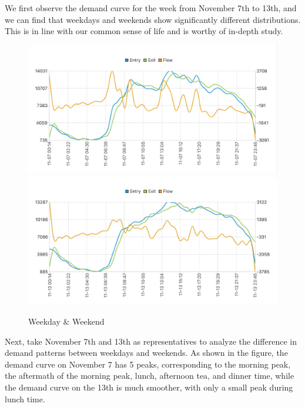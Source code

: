 \documentclass{article}
\begin{document}
We first observe the demand curve for the week from November 7th to 13th, and we can find that weekdays and weekends show significantly different distributions. This is in line with our common sense of life and is worthy of in-depth study.

\setlength{\parindent}{0em}
\begin{figure}[htbp] 
	\centering 
	\includegraphics[scale=0.14]{new_daily_07_demand.jpg}
	\includegraphics[scale=0.14]{new_daily_13_demand.jpg}
	\caption{Weekday \& Weekend}
\end{figure}
\setlength{\parindent}{2em}

Next, take November 7th and 13th as representatives to analyze the difference in demand patterns between weekdays and weekends. As shown in the figure, the demand curve on November 7 has 5 peaks, corresponding to the morning peak, the aftermath of the morning peak, lunch, afternoon tea, and dinner time, while the demand curve on the 13th is much smoother, with only a small peak during lunch time.
\end{document}
